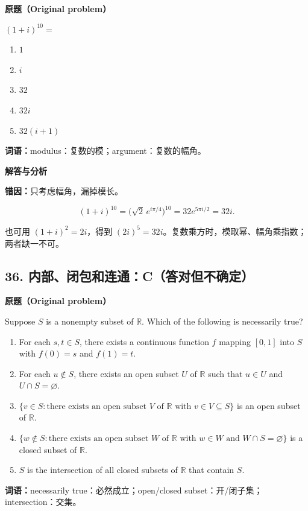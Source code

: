 \documentclass[11pt,a4paper,fontset=fandol]{ctexart}
\begin{document}
\textbf{原题（Original problem）}\par
$(1+i)^{10}=$
\begin{enumerate}[label=(\Alph*),nosep]
\item $1$ \item $i$ \item $32$ \item $32i$ \item $32(i+1)$
\end{enumerate}
\textbf{词语：}modulus：复数的模；argument：复数的幅角。

\textbf{解答与分析}\par


\textbf{错因：}只考虑幅角，漏掉模长。

\[ (1+i)^{10}=\bigl(\sqrt2\,e^{i\pi/4}\bigr)^{10}=32e^{5\pi i/2}=32i. \]

也可用 \((1+i)^2=2i\)，得到
\((2i)^5=32i\)。复数乘方时，模取幂、幅角乘指数；两者缺一不可。

\hypertarget{ux5185ux90e8ux95edux5305ux548cux8fdeux901acux7b54ux5bf9ux4f46ux4e0dux786eux5b9a}{%
\subsection{36.
内部、闭包和连通：C（答对但不确定）}\label{ux5185ux90e8ux95edux5305ux548cux8fdeux901acux7b54ux5bf9ux4f46ux4e0dux786eux5b9a}}

\textbf{原题（Original problem）}\par
Suppose $S$ is a nonempty subset of $\mathbb R$. Which of the following is necessarily true?
\begin{enumerate}[label=(\Alph*)]
\item For each $s,t\in S$, there exists a continuous function $f$ mapping $[0,1]$ into $S$ with $f(0)=s$ and $f(1)=t$.
\item For each $u\notin S$, there exists an open subset $U$ of $\mathbb R$ such that $u\in U$ and $U\cap S=\varnothing$.
\item $\{v\in S:\text{there exists an open subset }V\text{ of }\mathbb R\text{ with }v\in V\subseteq S\}$ is an open subset of $\mathbb R$.
\item $\{w\notin S:\text{there exists an open subset }W\text{ of }\mathbb R\text{ with }w\in W\text{ and }W\cap S=\varnothing\}$ is a closed subset of $\mathbb R$.
\item $S$ is the intersection of all closed subsets of $\mathbb R$ that contain $S$.
\end{enumerate}
\textbf{词语：}necessarily true：必然成立；open/closed subset：开/闭子集；intersection：交集。
\end{document}

